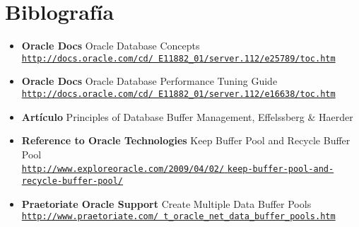 \section{Biblograf\'ia}


\begin{itemize}
  \item \textbf{Oracle Docs} Oracle Database Concepts \\
    \href{http://docs.oracle.com/cd/E11882_01/server.112/e25789/toc.htm}
    {\small \texttt{http://docs.oracle.com/cd/
    E11882\_01/server.112/e25789/toc.htm}}

  \item \textbf{Oracle Docs} Oracle Database Performance Tuning Guide \\
    \href{http://docs.oracle.com/cd/E11882_01/server.112/e16638/toc.htm}
    {\small \texttt{http://docs.oracle.com/cd/
    E11882\_01/server.112/e16638/toc.htm}}

  \item \textbf{Artículo} Principles of Database Buffer Management, 
    Effelssberg \& Haerder 

  \item \textbf{Reference to Oracle Technologies} 
    Keep Buffer Pool and Recycle Buffer Pool \\
    \href{http://www.exploreoracle.com/2009/04/02/keep-buffer-pool-and-recycle-buffer-pool/}
    {\small \texttt{http://www.exploreoracle.com/2009/04/02/}
    \texttt{keep-buffer-pool-and-recycle-buffer-pool/}}

  \item \textbf{Praetoriate Oracle Support} Create Multiple Data Buffer Pools\\
    \href{http://www.praetoriate.com/t_oracle_net_data_buffer_pools.htm}
    {\small \texttt{http://www.praetoriate.com/
    t\_oracle\_net\_data\_buffer\_pools.htm}}
\end{itemize}
